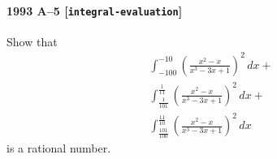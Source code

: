 \paragraph{1993 A--5 \textnormal{[\texttt{integral-evaluation}]}}
Show that
\begin{gather*}
\int_{-100}^{-10} \left( \frac{x^2 - x}{x^3 - 3x + 1} \right)^2\,dx + \\
\int_{\frac{1}{101}}^{\frac{1}{11}} \left( \frac{x^2 - x}{x^3 - 3x + 1} \right)^2\,dx + \\
\int_{\frac{101}{100}}^{\frac{11}{10}} \left( \frac{x^2 - x}{x^3 - 3x + 1} \right)^2\,dx
\end{gather*}
is a rational number.
